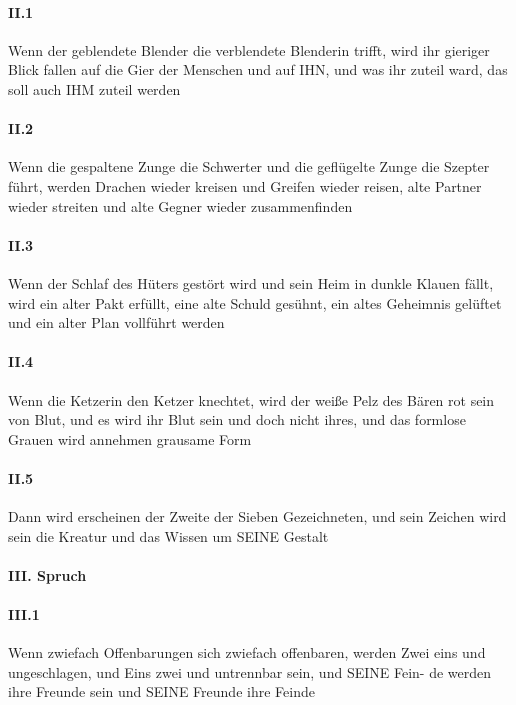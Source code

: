 \paragraph{II.1} Wenn der geblendete Blender die verblendete Blenderin trifft, wird ihr gieriger Blick fallen auf die Gier der Menschen und auf IHN, und was ihr zuteil ward, das soll auch IHM zuteil werden

\paragraph{II.2} Wenn die gespaltene Zunge die Schwerter und die geflügelte Zunge die Szepter führt, werden Drachen wieder kreisen und Greifen wieder reisen, alte Partner wieder streiten und alte Gegner wieder zusammenfinden

\paragraph{II.3} Wenn der Schlaf des Hüters gestört wird und sein Heim in dunkle Klauen fällt, wird ein alter Pakt erfüllt, eine alte Schuld gesühnt, ein altes Geheimnis gelüftet und ein alter Plan vollführt werden

\paragraph{II.4} Wenn die Ketzerin den Ketzer knechtet, wird der weiße Pelz des Bären rot sein von Blut, und es wird ihr Blut sein und doch nicht ihres, und das formlose Grauen wird annehmen grausame Form

\paragraph{II.5} Dann wird erscheinen der Zweite der Sieben Gezeichneten, und sein Zeichen wird sein die Kreatur und das Wissen um SEINE Gestalt

\paragraph{III. Spruch}

\paragraph{III.1} Wenn zwiefach Offenbarungen sich zwiefach offenbaren, werden Zwei
eins und ungeschlagen, und Eins zwei und untrennbar sein, und SEINE Fein- de werden ihre Freunde sein und SEINE Freunde ihre Feinde

